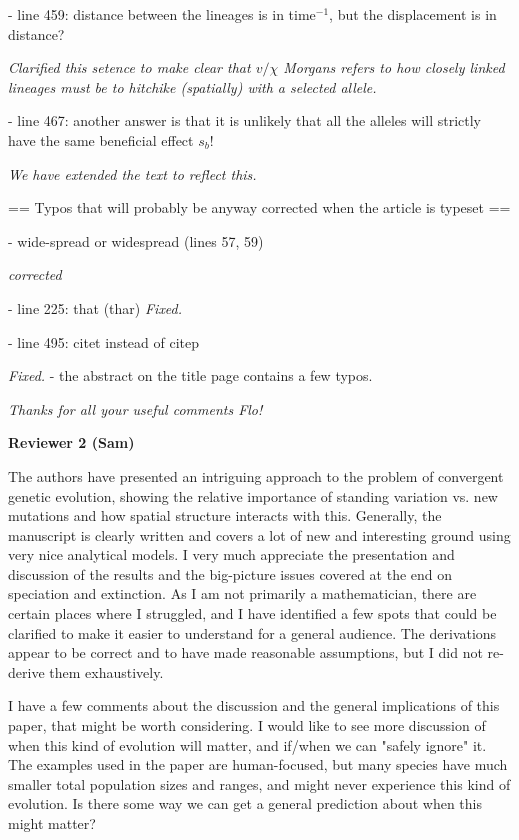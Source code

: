 \documentclass[12pt,letterpaper]{article}
\newcommand{\response}[1]{\emph{ \color{blue} #1}}
\begin{document}
- line 459: distance between the lineages is in time$^{-1}$, but the displacement is in distance?


\response{Clarified this setence to make clear that $ v/\chi$ Morgans refers to how closely linked lineages must be to hitchike (spatially) with a selected allele. }

- line 467: another answer is that it is unlikely that all the alleles will strictly have the same beneficial effect $s_b$!

\response{We have extended the text to reflect this.}

== Typos that will probably be anyway corrected when the article is typeset ==

- wide-spread or widespread (lines 57, 59) 

\response{corrected}

- line 225: that (thar)
\response{Fixed.}

- line 495: citet instead of citep

\response{Fixed.}
- the abstract on the title page contains a few typos.

\response{Thanks for all your useful comments Flo!}


\newpage 
{\bf Reviewer 2 (Sam)}

The authors have presented an intriguing approach to the problem of convergent genetic evolution, showing the relative importance of standing variation vs. new mutations and how spatial structure interacts with this. Generally, the manuscript is clearly written and covers a lot of new and interesting ground using very nice analytical models. I very much appreciate the presentation and discussion of the results and the big-picture issues covered at the end on speciation and extinction. As I am not primarily a mathematician, there are certain places where I struggled, and I have identified a few spots that could be clarified to make it easier to understand for a general audience. The derivations appear to be correct and to have made reasonable assumptions, but I did not re-derive them exhaustively.

I have a few comments about the discussion and the general implications of this paper, that might be worth considering. I would like to see more discussion of when this kind of evolution will matter, and if/when we can "safely ignore" it. The examples used in the paper are human-focused, but many species have much smaller total population sizes and ranges, and might never experience this kind of evolution. Is there some way we can get a general prediction about when this might matter?
\end{document}
